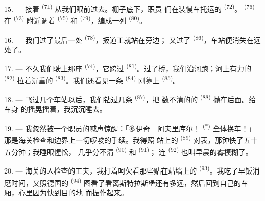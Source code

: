 
15. --- 接着 \textsuperscript{(71)} 从我们眼前过去。棚子底下，职员
们在装慢车托运的 \textsuperscript{(72)}。
\textsuperscript{(76)} 在 \textsuperscript{(73)} 附近调着
\textsuperscript{(75)} 和 \textsuperscript{(79)}，编成一列
\textsuperscript{(80)}。

16. --- 我们过了最后一处 \textsuperscript{(78)}，扳道工就站在旁边；
又过了 \textsuperscript{(86)}，车站便消失在远处了。

17. --- 不久我们驶上那座 \textsuperscript{(74)}，它跨过
 \textsuperscript{(81)}。过了桥，我们沿河跑；河上有力的 \textsuperscript{(82)}
拉着沉重的 \textsuperscript{(83)}。我们还看见一条
\textsuperscript{(84)} 刚靠上 \textsuperscript{(85)}。

18. --- 飞过几个车站以后，我们钻过几条 \textsuperscript{(87)}，把
数不清的的 \textsuperscript{(88)} 抛在后面。给车身
的摇晃摇着，我沉沉睡去。

\VUsaut{3.0mm}
\VUsaut{3.0mm}

19. --- 我忽然被一个职员的喊声惊醒：「多伊奇－阿夫里库尔！
\textsuperscript{(*)} 全体换车！」那是海关检查和边界上一切啰唆的手续。我得照
站上的 \textsuperscript{(89)} 对表，那钟快了五十五分钟；我睡眼惺忪，
几乎分不清 \textsuperscript{(90)} 和 \textsuperscript{(91)}；
连 \textsuperscript{(92)} 也叫早晨的雾模糊了。

20. --- 海关的人检查的工夫，我打着呵欠看那些贴在站墙上的
\textsuperscript{(93)}。我吃了早饭消磨时间，又照德国的 \textsuperscript{(94)}
图看了看离斯特拉斯堡还有多远，然后回到自己的车厢，心里因为快到目的地
而振作起来。
\VUsaut{6.0mm}
\VUfilet{22mm}
